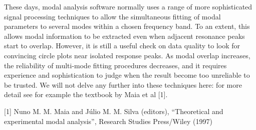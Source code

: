   These days, modal analysis software normally uses a range of more 
  sophisticated signal processing techniques to allow the simultaneous fitting 
  of modal parameters to several modes within a chosen frequency band. To an 
  extent, this allows modal information to be extracted even when adjacent 
  resonance peaks start to overlap. However, it is still a useful check on data 
  quality to look for convincing circle plots near isolated response peaks. As 
  modal overlap increases, the reliability of multi-mode fitting procedures 
  decreases, and it requires experience and sophistication to judge when the 
  result become too unreliable to be trusted. We will not delve any further 
  into these techniques here: for more detail see for example the textbook by 
  Maia et al [1]. 

  \sectionreferences{}[1] Nuno M. M. Maia and Júlio M. M. Silva (editors), 
  “Theoretical and experimental modal analysis”, Research Studies Press/Wiley 
  (1997) 
